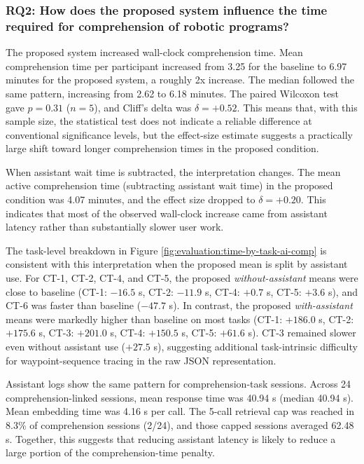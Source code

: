 \subsubsection*{RQ2: How does the proposed system influence the time required for comprehension of robotic programs?}
The proposed system increased wall-clock comprehension time. Mean comprehension time per participant increased from 3.25 for the baseline to 6.97 minutes for the proposed system, a roughly 2x increase. The median followed the same pattern, increasing from 2.62 to 6.18 minutes. The paired Wilcoxon test gave $p = 0.31$ ($n=5$), and Cliff's delta was $\delta = +0.52$. This means that, with this sample size, the statistical test does not indicate a reliable difference at conventional significance levels, but the effect-size estimate suggests a practically large shift toward longer comprehension times in the proposed condition.

When assistant wait time is subtracted, the interpretation changes. The mean active comprehension time (subtracting assistant wait time) in the proposed condition was 4.07 minutes, and the effect size dropped to $\delta = +0.20$. This indicates that most of the observed wall-clock increase came from assistant latency rather than substantially slower user work.

The task-level breakdown in Figure \ref{fig:evaluation:time-by-task-ai-comp} is consistent with this interpretation when the proposed mean is split by assistant use. For CT-1, CT-2, CT-4, and CT-5, the proposed \textit{without-assistant} means were close to baseline (CT-1: $-16.5$ s, CT-2: $-11.9$ s, CT-4: $+0.7$ s, CT-5: $+3.6$ s), and CT-6 was faster than baseline ($-47.7$ s). In contrast, the proposed \textit{with-assistant} means were markedly higher than baseline on most tasks (CT-1: $+186.0$ s, CT-2: $+175.6$ s, CT-3: $+201.0$ s, CT-4: $+150.5$ s, CT-5: $+61.6$ s). CT-3 remained slower even without assistant use ($+27.5$ s), suggesting additional task-intrinsic difficulty for waypoint-sequence tracing in the raw JSON representation.

Assistant logs show the same pattern for comprehension-task sessions. Across 24 comprehension-linked sessions, mean response time was 40.94 s (median 40.94 s). Mean embedding time was 4.16 s per call. The 5-call retrieval cap was reached in 8.3\% of comprehension sessions (2/24), and those capped sessions averaged 62.48 s. Together, this suggests that reducing assistant latency is likely to reduce a large portion of the comprehension-time penalty.

